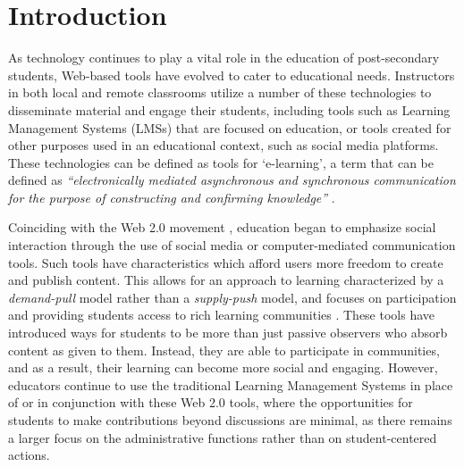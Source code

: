\chapter{Introduction}



As technology continues to play a vital role in the education of post-secondary students, Web-based tools have evolved to cater to educational needs. Instructors in both local and remote classrooms utilize a number of these technologies to disseminate material and engage their students, including tools such as Learning Management Systems (LMSs) that are focused on education, or tools created for other purposes used in an educational context, such as social media platforms. These technologies can be defined as tools for `e-learning', a term that can be defined as \textit{``electronically mediated asynchronous and synchronous communication for the purpose of constructing and confirming knowledge''} \cite{garrison2011learning}.

Coinciding with the Web 2.0 movement \cite{O'Reilly-What-2005}, education began to emphasize social interaction through the use of social media or computer-mediated communication tools. Such tools have characteristics which afford users more freedom to create and publish content. This allows for an approach to learning characterized by a \emph{demand-pull} model rather than a \emph{supply-push} model, and focuses on participation and providing students access to rich learning communities \cite{seely2008open}. These tools have introduced ways for students to be more than just passive observers who absorb content as given to them. Instead, they are able to participate in communities, and as a result, their learning can become more social and engaging. However, educators continue to use the traditional Learning Management Systems in place of or in conjunction with these Web 2.0 tools, where the opportunities for students to make contributions beyond discussions are minimal, as there remains a larger focus on the administrative functions rather than on student-centered actions.


